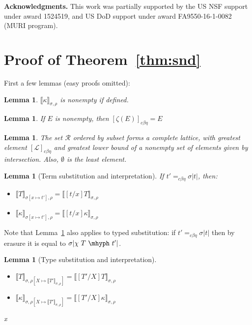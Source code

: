\documentclass{article}
\newcommand{\choice}[0]{\zeta}
\newcommand{\interp}[1]{\llbracket #1 \rrbracket}
\newcommand{\cbe}[0]{c\beta\eta}
\newtheorem{lemma}[theorem]{Lemma}
\begin{document}
\textbf{Acknowledgments.}  This work was partially supported by the US
NSF support under award 1524519, and US DoD support under award
FA9550-16-1-0082 (MURI program).






\appendix

\section{Proof of Theorem~\ref{thm:snd}}

First a few lemmas (easy proofs omitted):

\begin{lemma}
  $\interp{\kappa}_{\sigma,\rho}$ is nonempty if defined.
\end{lemma}

\begin{lemma}
\label{lem:choice}
If $E$ is nonempty, then $[\choice(E)]_{\cbe} = E$
\end{lemma}

\begin{lemma}
  The set $\mathcal{R}$ ordered by subset forms a complete lattice,
  with greatest element $[\mathcal{L}]_{\cbe}$ and greatest lower bound
  of a nonempty set of elements given by
  intersection.  Also, $\emptyset$ is the least element.
\end{lemma}

\begin{lemma}[Term substitution and interpretation]
\label{lem:termsubstinterp}
If $t' =_{\cbe} \sigma |t|$, then: 
\begin{itemize}
\item $\interp{T}_{\sigma[x\mapsto t'],\rho} = \interp{[t/x]T}_{\sigma,\rho}$
\item $\interp{\kappa}_{\sigma[x\mapsto t'],\rho} = \interp{[t/x]\kappa}_{\sigma,\rho}$
\end{itemize}
\end{lemma}

Note that Lemma~\ref{lem:termsubstinterp} also applies to typed substitution: if
\(t' =_{\cbe} \sigma|t|\) then by erasure it is equal to \(\sigma|\chi\ T\
\mhyph\ t'|\).

\begin{lemma}[Type substitution and interpretation] 
  \label{lem:tpsubstinterp}
  \ \\
  \begin{itemize}
  \item $\interp{T}_{\sigma,\rho[X\mapsto\interp{T'}_{\sigma,\rho}]} = \interp{[T'/X]T}_{\sigma,\rho}$
  \item $\interp{\kappa}_{\sigma,\rho[X\mapsto\interp{T'}_{\sigma,\rho}]} = \interp{[T'/X]\kappa}_{\sigma,\rho}$
  \end{itemize}
x\end{lemma}
\end{document}

